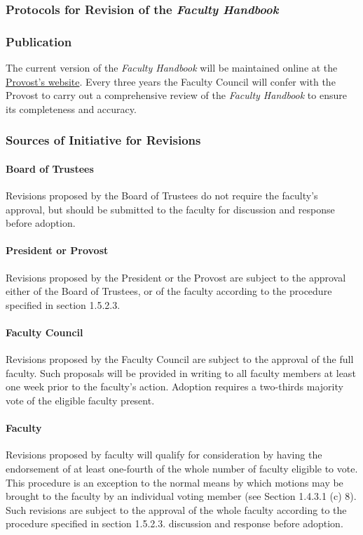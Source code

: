 \documentclass[letterpaper, 11pt]{article}
\begin{document}
		\subsubsection{Protocols for Revision of the \emph{Faculty Handbook}}
		\subsubsection{Publication}
			The current version of the \emph{Faculty Handbook} will be maintained online at the \href{http://www.westmont.edu/_offices/provost/documents/Faculty-Handbook.pdf}{Provost's website}.  Every three years the Faculty Council will confer with the Provost to carry out a comprehensive review of the \emph{Faculty Handbook} to ensure its completeness and accuracy.
		\subsubsection{Sources of Initiative for Revisions}
			\paragraph{Board of Trustees}
				Revisions proposed by the Board of Trustees do not require the faculty's approval, but should be submitted to the faculty for discussion and response before adoption.
			\paragraph{President or Provost}
				Revisions proposed by the President or the Provost are subject to the approval either of the Board of Trustees, or of the faculty according to the procedure specified in section 1.5.2.3.
			\paragraph{Faculty Council}
				Revisions proposed by the Faculty Council are subject to the approval of the full faculty. Such proposals will be provided in writing to all faculty members at least one week prior to the faculty's action. Adoption requires a two-thirds majority vote of the eligible faculty present.
			\paragraph{Faculty}
				Revisions proposed by faculty will qualify for consideration by having the endorsement of at least one-fourth of the whole number of faculty eligible to vote. This procedure is an exception to the normal means by which motions may be brought to the faculty by an individual voting member (see Section 1.4.3.1 (c) 8).  Such revisions are subject to the approval of the whole faculty according to the procedure specified in section 1.5.2.3.
				discussion and response before adoption.
\end{document}
